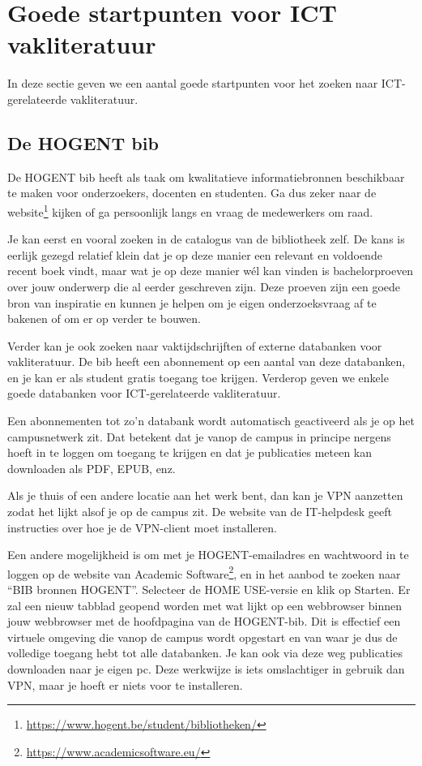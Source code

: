 \section{Goede startpunten voor ICT vakliteratuur}%
\label{sec:startpunten-ict-vakliteratuur}

In deze sectie geven we een aantal goede startpunten voor het zoeken naar ICT-gerelateerde vakliteratuur.

\subsection{De HOGENT bib}%
\label{ssec:hogent-bib}

De HOGENT bib heeft als taak om kwalitatieve informatiebronnen beschikbaar te maken voor onderzoekers, docenten en studenten. Ga dus zeker naar de website\footnote{\url{https://www.hogent.be/student/bibliotheken/}} kijken of ga persoonlijk langs en vraag de medewerkers om raad.

Je kan eerst en vooral zoeken in de catalogus van de bibliotheek zelf. De kans is eerlijk gezegd relatief klein dat je op deze manier een relevant en voldoende recent boek vindt, maar wat je op deze manier wél kan vinden is bachelorproeven over jouw onderwerp die al eerder geschreven zijn. Deze proeven zijn een goede bron van inspiratie en kunnen je helpen om je eigen onderzoeksvraag af te bakenen of om er op verder te bouwen.

Verder kan je ook zoeken naar vaktijdschrijften of externe databanken voor vakliteratuur. De bib heeft een abonnement op een aantal van deze databanken, en je kan er als student gratis toegang toe krijgen. Verderop geven we enkele goede databanken voor ICT-gerelateerde vakliteratuur.

Een abonnementen tot zo'n databank wordt automatisch geactiveerd als je op het campusnetwerk zit. Dat betekent dat je vanop de campus in principe nergens hoeft in te loggen om toegang te krijgen en dat je publicaties meteen kan downloaden als PDF, EPUB, enz.

Als je thuis of een andere locatie aan het werk bent, dan kan je VPN aanzetten zodat het lijkt alsof je op de campus zit. De website van de IT-helpdesk geeft instructies over hoe je de VPN-client moet installeren.

Een andere mogelijkheid is om met je HOGENT-emailadres en wachtwoord in te loggen op de website van Academic Software\footnote{\url{https://www.academicsoftware.eu/}}, en in het aanbod te zoeken naar ``BIB bronnen HOGENT''. Selecteer de HOME USE-versie en klik op Starten. Er zal een nieuw tabblad geopend worden met wat lijkt op een webbrowser binnen jouw webbrowser met de hoofdpagina van de HOGENT-bib. Dit is effectief een virtuele omgeving die vanop de campus wordt opgestart en van waar je dus de volledige toegang hebt tot alle databanken. Je kan ook via deze weg publicaties downloaden naar je eigen pc. Deze werkwijze is iets omslachtiger in gebruik dan VPN, maar je hoeft er niets voor te installeren.


